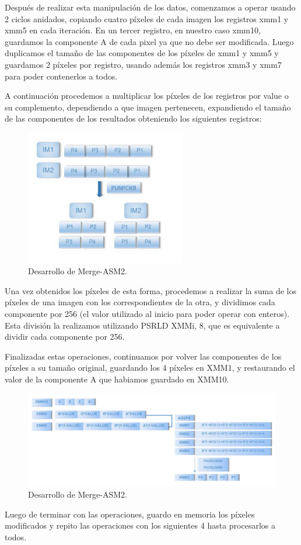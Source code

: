 Después de realizar esta manipulación de los datos, comenzamos a operar usando 2 ciclos anidados, copiando cuatro píxeles de cada imagen los registros xmm1 y xmm5 en cada iteración. En un tercer registro, en nuestro caso xmm10, guardamos la componente A de cada pixel ya que no debe ser modificada. Luego duplicamos el tamaño de las componentes de los píxeles de xmm1 y xmm5 y guardamos 2 píxeles por registro, usando además los registros xmm3 y xmm7 para poder contenerlos a todos.

A continuación procedemos a multiplicar los píxeles de los registros por value o su complemento, dependiendo a que imagen pertenecen, expandiendo el tamaño de las componentes de los resultados obteniendo los siguientes registros:

\begin{figure}[ht!]
\centering
\includegraphics[width=70mm]{imagenes/merge/merge2-2.png}
\caption{Desarrollo de Merge-ASM2.}
\end{figure}

Una vez obtenidos los píxeles de esta forma, procedemos a realizar la suma de los píxeles de una imagen con los correspondientes de la otra, y dividimos cada componente por 256 (el valor utilizado al inicio para poder operar con enteros). Esta división la realizamos utilizando PSRLD XMMi, 8, que es equivalente a dividir cada componente por 256.

Finalizadas estas operaciones, continuamos por volver las componentes de los píxeles a su tamaño original, guardando los 4 píxeles en XMM1, y restaurando el valor de la componente A que habiamos guardado en XMM10.

\begin{figure}[ht!]
\centering
\includegraphics[width=140mm]{imagenes/merge/merge2-3.png}
\caption{Desarrollo de Merge-ASM2.}
\end{figure}

Luego de terminar con las operaciones, guardo en memoria los píxeles modificados y repito las operaciones con los siguientes 4 hasta procesarlos a todos.